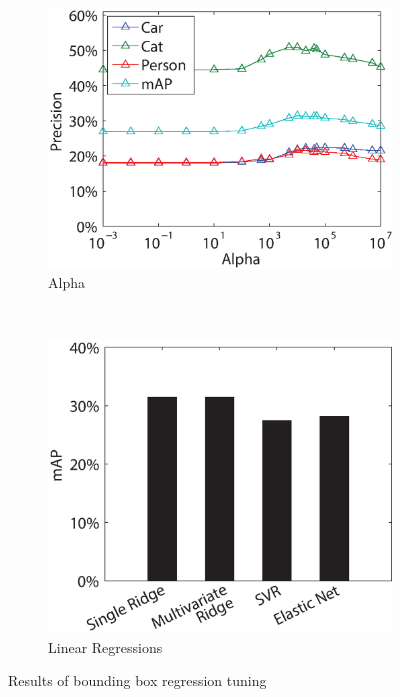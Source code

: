 \documentclass[10pt,twocolumn,letterpaper]{article}
\begin{document}
\begin{figure}
        \centering
        \begin{subfigure}[b]{0.24\textwidth}
                \includegraphics[width=\textwidth]{figures/tuning/alpha.eps}
                \vspace{0.2mm}
                \caption{Alpha}
                \label{fig:alpha}
        \end{subfigure}%
        ~ 
        \begin{subfigure}[b]{0.24\textwidth}
                \includegraphics[width=\textwidth]{figures/tuning/regressions.eps}
                \caption{Linear Regressions}
                \label{fig:linear_regressions}
        \end{subfigure}
        \caption{Results of bounding box regression tuning}
\end{figure}
\end{document}
